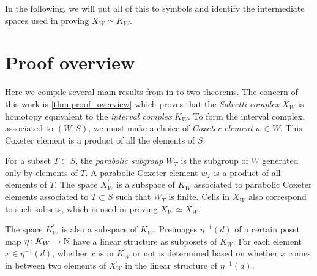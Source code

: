 \documentclass[class=guthesis, crop=false]{standalone}
\begin{document}
In the following, we will put all of this to symbols and identify the intermediate spaces used in proving $X_W \simeq K_W$.

\section{Proof overview}

Here we compile several main results from \cite{paolini_salvetti_kpi1_2021} in to two theorems. The concern of this work is \cref{thm:proof_overview} which proves that the \emph{Salvetti complex} $X_W$ is homotopy equivalent to the \emph{interval complex} $K_W$. To form the interval complex, associated to $(W,S)$, we must make a choice of \emph{Coxeter element} $w \in W$. This Coxeter element is a product of all the elements of $S$.

For a subset $T \subset S$, the \emph{parabolic subgroup} $W_T$ is the subgroup of $W$ generated only by elements of $T$. A parabolic Coxeter element $w_T$ is a product of all elements of $T$. The space $X_W^\prime$ is a subspace of $K_W$ associated to parabolic Coxeter elements associated to $T \subset S$ such that $W_T$ is finite. Cells in $X_W$ also correspond to such subsets, which is used in proving $X_W \simeq X_W^\prime$.

The space $K_W^\prime$ is also a subspace of $K_W$. Preimages $\eta^{-1}(d)$ of a certain poset map $\eta \colon K_W \to \mathbb{N}$ have a linear structure as subposets of $K_W$. For each element $x \in \eta^{-1}(d)$, whether $x$ is in $K_W^\prime$ or not is determined based on whether $x$ comes in between two elements of $X_W^\prime$ in the linear structure of $\eta^{-1}(d)$.
\end{document}
